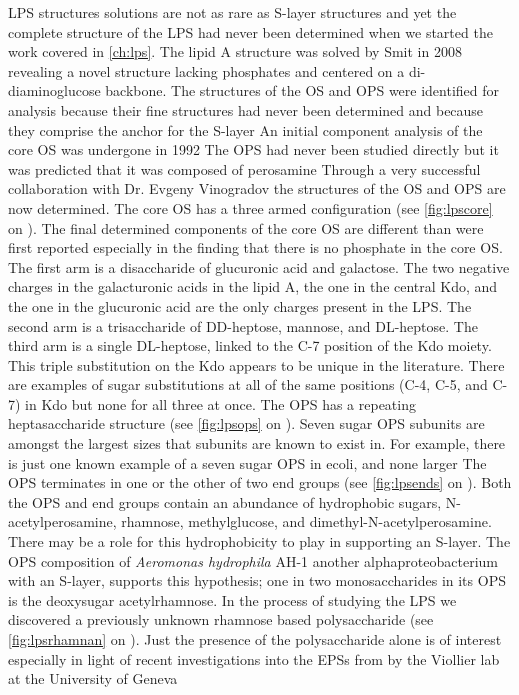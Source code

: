\ac{LPS} structures solutions are not as rare as \ac{S-layer} structures and yet the complete structure of the \caulobacter{} \ac{LPS} had never been determined when we started the work covered in \cref{ch:lps}. The \caulobacter{} lipid A structure was solved by Smit \etal{} in 2008 revealing a novel structure lacking phosphates and centered on a di-diaminoglucose backbone. The structures of the \ac{OS} and \ac{OPS} were identified for analysis because their fine structures had never been determined and because they comprise the anchor for the \caulobacter{} \ac{S-layer} An initial component analysis of the core \ac{OS} was undergone in 1992 The \ac{OPS} had never been studied directly but it was predicted that it was composed of perosamine Through a very successful collaboration with Dr. Evgeny Vinogradov the structures of the \caulobacter{} \ac{OS} and \ac{OPS} are now determined. The core \ac{OS} has a three armed configuration (see \cref{fig:lpscore} on ). The final determined components of the core \ac{OS} are different than were first reported especially in the finding that there is no phosphate in the core \ac{OS}. The first arm is a disaccharide of glucuronic acid and galactose. The two negative charges in the galacturonic acids in the lipid A, the one in the central Kdo, and the one in the glucuronic acid are the only charges present in the \caulobacter{} \ac{LPS}. The second arm is a trisaccharide of DD-heptose, mannose, and DL-heptose. The third arm is a single DL-heptose, linked to the C-7 position of the Kdo moiety. This triple substitution on the Kdo appears to be unique in the literature. There are examples of sugar substitutions at all of the same positions (C-4, C-5, and C-7) in Kdo but none for all three at once. The \ac{OPS} has a repeating heptasaccharide structure (see \cref{fig:lpsops} on ). Seven sugar \ac{OPS} subunits are amongst the largest sizes that subunits are known to exist in. For example, there is just one known example of a seven sugar \ac{OPS} in \acl{ecoli}, and none larger The \caulobacter{} \ac{OPS} terminates in one or the other of two end groups (see \cref{fig:lpsends} on ). Both the \ac{OPS} and end groups contain an abundance of hydrophobic sugars, \ie N-acetylperosamine, rhamnose, methylglucose, and dimethyl-N-acetylperosamine. There may be a role for this hydrophobicity to play in supporting an \ac{S-layer}. The \ac{OPS} composition of \textit{Aeromonas hydrophila} AH-1 another alphaproteobacterium with an \ac{S-layer}, supports this hypothesis; one in two monosaccharides in its \ac{OPS} is the deoxysugar acetylrhamnose. In the process of studying the \caulobacter{} \ac{LPS} we discovered a previously unknown rhamnose based polysaccharide (see \cref{fig:lpsrhamnan} on ). Just the presence of the polysaccharide alone is of interest especially in light of recent investigations into the \acp{EPS} from \caulobacter{} by the Viollier lab at the University of Geneva  

